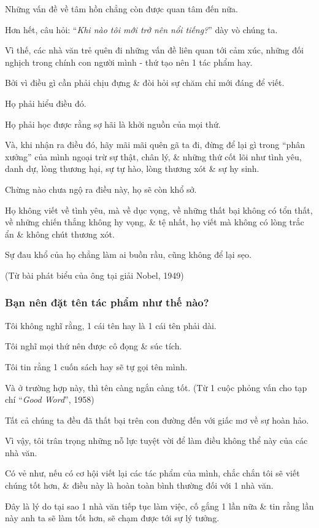 \documentclass{article}
\begin{document}
Những vấn đề về tâm hồn chẳng còn được quan tâm đến nữa.

Hơn hết, câu hỏi: ``\textit{Khi nào tôi mới trở nên nổi tiếng?}'' dày vò chúng ta.

Vì thế, các nhà văn trẻ quên đi những vấn đề liên quan tới cảm xúc, những đối nghịch trong chính con người mình - thứ tạo nên 1 tác phẩm hay.

Bởi vì điều gì cần phải chịu đựng \& đòi hỏi sự chăm chỉ mới đáng để viết.

%
Họ phải hiểu điều đó.

Họ phải học được rằng sợ hãi là khởi nguồn của mọi thứ.

Và, khi nhận ra điều đó, hãy mãi mãi quên gã ta đi, đừng để lại gì trong ``phân xưởng'' của mình ngoại trừ sự thật, chân lý, \& những thứ cốt lõi như tình yêu, danh dự, lòng thương hại, sự tự hào, lòng thương xót \& sự hy sinh.

Chừng nào chưa ngộ ra điều này, họ sẽ còn khổ sở.

Họ không viết về tình yêu, mà về dục vọng, về những thất bại không có tổn thất, về những chiến thắng không hy vọng, \& tệ nhất, họ viết mà không có lòng trắc ẩn \& không chút thương xót.

Sự đau khổ của họ chẳng làm ai buồn rầu, cũng không để lại sẹo.

(Từ bài phát biểu của ông tại giải Nobel, 1949)

\subsubsection{Bạn nên đặt tên tác phẩm như thế nào?}
Tôi không nghĩ rằng, 1 cái tên hay là 1 cái tên phải dài.

Tôi nghĩ mọi thứ nên được cô đọng \& súc tích.

Tôi tin rằng 1 cuốn sách hay sẽ tự gọi tên mình.

Và ở trường hợp này, thì tên càng ngắn càng tốt. (Từ 1 cuộc phỏng vấn cho tạp chí ``\textit{Good Word}'', 1958)

%
Tất cả chúng ta đều đã thất bại trên con đường đến với giấc mơ về sự hoàn hảo.

Vì vậy, tôi trân trọng những nỗ lực tuyệt vời để làm điều không thể này của các nhà văn.

Có vẻ như, nếu có cơ hội viết lại các tác phẩm của mình, chắc chắn tôi sẽ viết chúng tốt hơn, \& điều này là hoàn toàn bình thường đối với 1 nhà văn.

Đây là lý do tại sao 1 nhà văn tiếp tục làm việc, cố gắng 1 lần nữa \& tin rằng lần này anh ta sẽ làm tốt hơn, sẽ chạm được tới sự lý tưởng.
\end{document}
